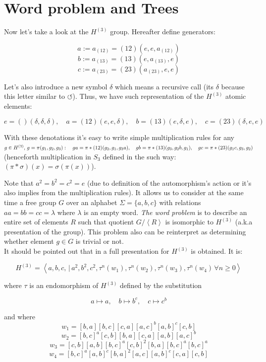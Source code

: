 \documentclass[a4paper,12pt]{amsart}
\begin{document}
\section{Word problem and Trees}

Now let's take a look at the $H^{(3)}$ group. Hereafter define generators:

$$ a := a_{(12)} = (1 2) (e, e, a_{(12)}) $$
$$ b := a_{(13)} = (1 3) (e, a_{(13)}, e) $$
$$ c := a_{(23)} = (2 3) (a_{(23)}, e, e) $$

Let's also introduce a new symbol $\delta$ which means a recursive call (its $\delta$ because
this letter similar to $\circlearrowleft$). Thus, we
have such representation of the $H^{(3)}$ atomic elements:

$$ e = () (\delta, \delta, \delta), \quad a = (1 2) (e, e, \delta), \quad
b = (1 3)(e, \delta, e), \quad c = (2 3)(\delta, e, e)$$

With these denotations it's easy to write simple multiplication rules for any
$g \in H^{(3)}, \, g = \pi (g_1, g_2, g_3):\\ \quad g a = \pi * (12) (g_2, g_1, g_3a), \quad
g b = \pi* (13) (g_3, g_2b, g_1), \quad g c = \pi * (23) (g_1c, g_3, g_2)$ (henceforth multiplication
in $S_3$ defined in the such way: $(\pi * \sigma) (x) = \sigma(\pi(x))$).

Note that $a^2 = b^2 = c^2 = e$ (due to definition of the automorphism's action or
it's also implies from the multiplication rules). It allows us to consider at the same
time a free group $G$ over an alphabet $\Sigma = \{a, b, c\}$ with relations
$aa = bb = cc = \lambda$ where $\lambda$ is an empty word.
\textit{The word problem} is to describe an entire set of elements $R$
such that quotient $G / \left\langle R \right\rangle$ is isomorphic to $H^{(3)}$
(a.k.a presentation of the group). This problem also can be reinterpret
as determining whether element $g \in G$ is trivial or not.
\\

It should be pointed out that in \cite{HRepr} a full presentation for $H^{(3)}$ is obtained. It is:

$$ H^{(3)} = \left\langle
	a, b, c,\, |\, a^2, b^2, c^2, \tau^n(w_1), \tau^n(w_2), \tau^n(w_3), \tau^n(w_4) \, \forall n \ge 0
\right\rangle $$

where $\tau$ is an endomorphism of $H^{(3)}$ defined by the substitution

$$ a \mapsto a, \quad b \mapsto b^c, \quad c \mapsto c^b$$

and where
$$ w_1 = [b, a][b, c][c, a][a, c]^b[a, b]^c[c, b] $$
$$ w_2 = [b, c]^a[c, b][b, a][c, a][a, b][a, c]^b $$
$$ w_3 = [c, b][a, b][b, c]^a[c, b]^2[b, a][b, c]^a[b, c]^a $$
$$ w_4 = [b, c]^a[a, b]^c[b, a]^2[a, c][a, b]^c[c, a][c, b] $$
\end{document}
